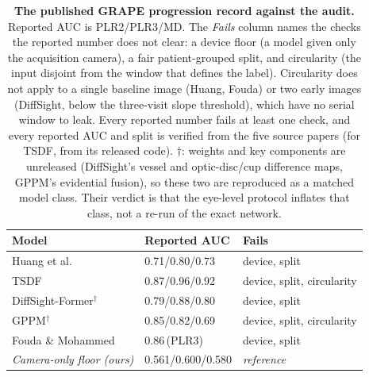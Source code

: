 \begin{table}[t]
  \centering
  \footnotesize
  \setlength{\tabcolsep}{6pt}
  \renewcommand{\arraystretch}{1.2}
  \caption{\textbf{The published GRAPE progression record against the audit.} Reported AUC is PLR2/PLR3/MD. The
  \emph{Fails} column names the checks the reported number does not clear: a device floor (a model given only the
  acquisition camera), a fair patient-grouped split, and circularity (the input disjoint from the window that defines the
  label). Circularity does not apply to a single baseline image (Huang, Fouda) or two early images (DiffSight, below the
  three-visit slope threshold), which have no serial window to leak. Every reported number fails at least one check, and
  every reported AUC and split is verified from the five source papers (for TSDF, from its released code). $\dagger$:
  weights and key components are unreleased (DiffSight's vessel and optic-disc/cup difference maps, GPPM's evidential
  fusion), so these two are reproduced as a matched model class. Their verdict is that the eye-level protocol inflates
  that class, not a re-run of the exact network.}
  \label{tab:priorclaims}
  \begin{tabular}{@{}lll@{}}
    \toprule
    Model & Reported AUC & Fails \\
    \midrule
    Huang et al.\ \citep{huang2023grape}       & 0.71/0.80/0.73    & device, split \\
    TSDF \citep{song2025tsdf}                   & 0.87/0.96/0.92    & device, split, circularity \\
    DiffSight-Former$^\dagger$ \citep{huang2026diffsight} & 0.79/0.88/0.80 & device, split \\
    GPPM$^\dagger$ \citep{zheng2025gppm}         & 0.85/0.82/0.69    & device, split, circularity \\
    Fouda \& Mohammed \citep{fouda2025}         & 0.86\,(PLR3)      & device, split \\
    \midrule
    \textit{Camera-only floor (ours)}           & 0.561/0.600/0.580 & \textit{reference} \\
    \bottomrule
  \end{tabular}
\end{table}
